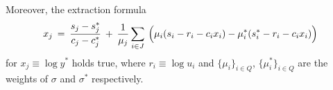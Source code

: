 \documentclass{iacrtrans}
\begin{document}
\begin{prop}
\begin{equation}
\end{equation}
Moreover, the extraction formula
\vspace{5pt}
\begin{equation}\label{orst_extraction}
x_j
\hspace{2pt}
=
\hspace{2pt}
\frac{s_j - s_j^*}{c_j - c_j^*}
\hspace{2pt}
+
\hspace{2pt}
\frac{1}{\mu_j} \sum_{i \in J}
\hspace{2pt}
\Big(
	\mu_i (s_i - r_i - c_i x_i) -
	\mu_i^* (s_i^* - r_i - c_i x_i)
\Big)
\vspace{5pt}
\end{equation}
for $x_j \equiv \log y^*$ holds true, where
$r_i \equiv \log u_i$
and 
$\{\mu_i\}_{i \in Q}$, $\{\mu_i^*\}_{i \in Q}$
are the weights of
$\sigma$ and $\sigma^*$ respectively.
\end{prop}
\end{document}
